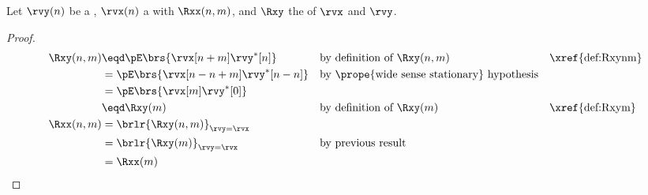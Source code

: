 \begin{proposition}
\label{prop:Rxynmm}
\label{prop:Rxxnmm}
Let $\rvy(n)$ be a ,
    $\rvx(n)$    a  with  $\Rxx(n,m)$,
and $\Rxy$    the  of $\rvx$ and $\rvy$.
\end{proposition}
\begin{proof}
\begin{align*}
  \Rxy(n,m)
     &\eqd \pE\brs{\rvx[n+m]\rvy^\ast[n]}
     &&    \text{by definition of $\Rxy(n,m)$}
     &&    \text{\xref{def:Rxynm}}
   \\&=    \pE\brs{\rvx[n-n+m]\rvy^\ast[n-n]}
     &&    \text{by \prope{wide sense stationary} hypothesis}
   \\&=    \pE\brs{\rvx[m]\rvy^\ast[0]}
   \\&\eqd \Rxy(m)
     && \text{by definition of $\Rxy(m)$}
     && \text{\xref{def:Rxym}}
   \\
  \Rxx(n,m)
     &=    \brlr{\Rxy(n,m)}_{\rvy=\rvx}
   \\&=    \brlr{\Rxy(m)}_{\rvy=\rvx}
     && \text{by previous result}
   \\&= \Rxx(m)
\end{align*}
\end{proof}


